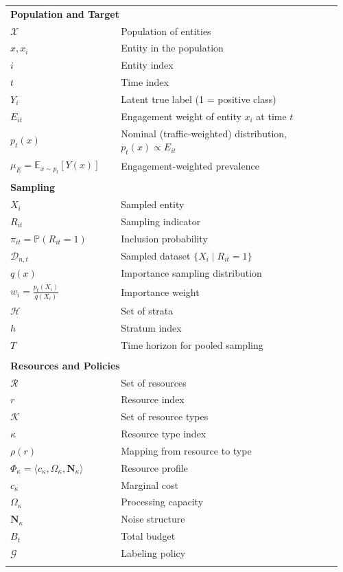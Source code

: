 \documentclass[12pt]{article}
\begin{document}
\begin{longtable}{p{0.32\linewidth} p{0.64\linewidth}}

\multicolumn{2}{l}{\textbf{Population and Target}} \\
$\mathcal{X}$ & Population of entities \\
$x, x_i$ & Entity in the population \\
$i$ & Entity index \\
$t$ & Time index \\
$Y_i$ & Latent true label (1 = positive class) \\
$E_{it}$ & Engagement weight of entity $x_i$ at time $t$ \\
$p_t(x)$ & Nominal (traffic-weighted) distribution, $p_t(x) \propto E_{it}$ \\
$\mu_E = \mathbb{E}_{x \sim p_t}[Y(x)]$ & Engagement-weighted prevalence \\
\\[3pt]

\multicolumn{2}{l}{\textbf{Sampling}} \\
$X_i$ & Sampled entity \\
$R_{it}$ & Sampling indicator \\
$\pi_{it} = \mathbb{P}(R_{it}=1)$ & Inclusion probability \\
$\mathcal{D}_{n,t}$ & Sampled dataset $\{X_i \mid R_{it}=1\}$ \\
$q(x)$ & Importance sampling distribution \\
$w_i = \frac{p_t(X_i)}{q(X_i)}$ & Importance weight \\
$\mathcal{H}$ & Set of strata \\
$h$ & Stratum index \\
$T$ & Time horizon for pooled sampling \\
\\[3pt]

\multicolumn{2}{l}{\textbf{Resources and Policies}} \\
$\mathcal{R}$ & Set of resources \\
$r$ & Resource index \\
$\mathcal{K}$ & Set of resource types \\
$\kappa$ & Resource type index \\
$\rho(r)$ & Mapping from resource to type \\
$\Phi_\kappa = \langle c_\kappa, \Omega_\kappa, \mathbf{N}_\kappa \rangle$ & Resource profile \\
$c_\kappa$ & Marginal cost \\
$\Omega_\kappa$ & Processing capacity \\
$\mathbf{N}_\kappa$ & Noise structure \\
$B_t$ & Total budget \\
$\mathcal{G}$ & Labeling policy \\
\\[3pt]


\end{longtable}
\end{document}
